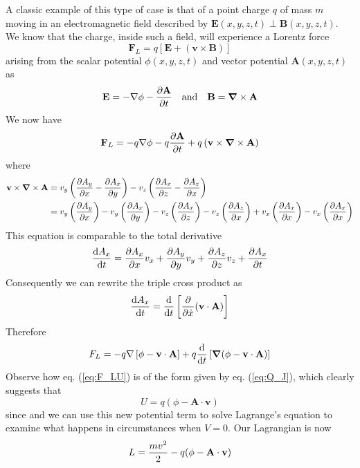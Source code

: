 \documentclass[english,seminar,headertitle]{lecture}
\begin{document}
A classic example of this type of case is that of a point charge $q$ of mass $m$ moving in an electromagnetic field described by $\mathbf{E}(x,y,z,t) \perp \mathbf{B}(x,y,z,t)$. We know that the charge, inside such a field, will experience a Lorentz force
\begin{equation}
	\mathbf{F}_L = q [ \mathbf{E} + ( \mathbf{v} \times \mathbf{B} ) ]
	\label{eq:F_L-std}
\end{equation}
arising from the scalar potential $\phi(x,y,z,t)$ and vector potential $\mathbf{A}(x,y,z,t)$ as
$$
\mathbf{E} = -\nabla\phi - {\partial \mathbf{A} \over \partial t} \quad \textrm{and} \quad \mathbf{B} = \boldsymbol{\nabla} \times \mathbf{A}
$$
We now have
$$
\mathbf{F}_L = -q\nabla\phi - q{\partial \mathbf{A} \over \partial t} + q \left( \mathbf{v} \times \boldsymbol{\nabla} \times \mathbf{A} \right)
$$
where
\begin{align*}
	\mathbf{v} \times \boldsymbol{\nabla} \times \mathbf{A} &= v_y \left( {\partial A_y \over \partial x} - {\partial A_x \over \partial y} \right) - v_z \left( {\partial A_x \over \partial z} - {\partial A_z \over \partial x} \right) \\
	&= v_y \left( {\partial A_y \over \partial x} \right) - v_y \left( {\partial A_x \over \partial y} \right) - v_z \left( {\partial A_x \over \partial z} \right) - v_z \left( {\partial A_z \over \partial x} \right) + v_x \left( {\partial A_x \over \partial x} \right) - v_x \left( {\partial A_x \over \partial x} \right)
\end{align*}
This equation is comparable to the total derivative
$$
{\textrm{d}A_x \over \textrm{d}t} = {\partial A_x \over \partial x} v_x + {\partial A_y \over \partial y} v_y + {\partial A_z \over \partial z} v_z + {\partial A_x \over \partial t}
$$
Consequently we can rewrite the triple cross product as
$$
{\textrm{d}A_x \over \textrm{d}t} = {\textrm{d}\over\textrm{d}t}\left[ {\partial \over \partial \dot{x}} (\mathbf{v} \cdot \mathbf{A}) \right]
$$
Therefore
\begin{equation}
	F_L = -q\nabla \left[ \phi - \mathbf{v} \cdot \mathbf{A} \right] + q {\textrm{d} \over \textrm{d} t} \left[ \boldsymbol{\nabla} ( \phi - \mathbf{v} \cdot \mathbf{A} ) \right]
	\label{eq:F_LU}
\end{equation}%
Observe how eq. (\ref{eq:F_LU}) is of the form given by eq. (\ref{eq:Q_J}), which clearly suggests that
\begin{equation}
U = q \left( \phi - \mathbf{A}\cdot\mathbf{v} \right)
\label{eq:U}
\end{equation}%
since  and we can use this new potential term to solve Lagrange's equation to examine what happens in circumstances when $V = 0$. Our Lagrangian is now
$$
L = {mv^2 \over 2} - q ( \phi - \mathbf{A}\cdot\mathbf{v} )
$$
\end{document}
